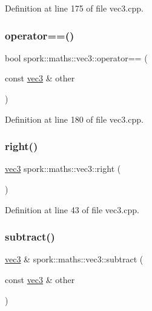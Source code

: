 Definition at line 175 of file vec3.\+cpp.

\mbox{\label{structspork_1_1maths_1_1vec3_a5251f074a2049d02a9c7edb66a9b3596}} 
\subsubsection{\texorpdfstring{operator==()}{operator==()}}
{\footnotesize\ttfamily bool spork\+::maths\+::vec3\+::operator== (\begin{DoxyParamCaption}\item[{const \hyperlink{structspork_1_1maths_1_1vec3}{vec3} \&}]{other }\end{DoxyParamCaption})}



Definition at line 180 of file vec3.\+cpp.

\mbox{\label{structspork_1_1maths_1_1vec3_ab70b578c5f09ed3323ce8159a3e243a4}} 
\subsubsection{\texorpdfstring{right()}{right()}}
{\footnotesize\ttfamily \hyperlink{structspork_1_1maths_1_1vec3}{vec3} spork\+::maths\+::vec3\+::right (\begin{DoxyParamCaption}{ }\end{DoxyParamCaption})\hspace{0.3cm}{\ttfamily [static]}}



Definition at line 43 of file vec3.\+cpp.

\mbox{\label{structspork_1_1maths_1_1vec3_ae2866e51829d78e72eb2e2c4b053e951}} 
\subsubsection{\texorpdfstring{subtract()}{subtract()}\hspace{0.1cm}{\footnotesize\ttfamily [1/2]}}
{\footnotesize\ttfamily \hyperlink{structspork_1_1maths_1_1vec3}{vec3} \& spork\+::maths\+::vec3\+::subtract (\begin{DoxyParamCaption}\item[{const \hyperlink{structspork_1_1maths_1_1vec3}{vec3} \&}]{other }\end{DoxyParamCaption})}



